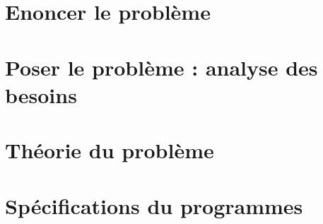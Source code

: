 \section{Enoncer le problème}

\section{Poser le problème : analyse des besoins}
\label{sec:poser_prob}

\section{Théorie du problème}
\label{sec:th_prob}

\section{Spécifications du programmes}

%